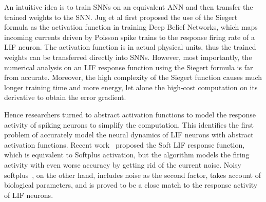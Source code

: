 \documentclass{article}
\begin{document}
An intuitive idea is to train SNNs on an equivalent ANN and then transfer the trained weights to the SNN.
Jug et al\cite{Jug_etal_2012} first proposed the use of the Siegert formula as the activation function in training Deep Belief Networks, which maps incoming currents driven by Poisson spike trains to the response firing rate of a LIF neuron.
The activation function is in actual physical units, thus the trained weights can be transferred directly into SNNs.
However, most importantly, the numerical analysis on an LIF response function using the Siegert formula is far from accurate.
Moreover, the high complexity of the Siegert function causes much longer training time and more energy, let alone the high-cost computation on its derivative to obtain the error gradient.

Hence researchers turned to abstract activation functions to model the response activity of spiking neurons to simplify the computation. %
This identifies the first problem of accurately model the neural dynamics of LIF neurons with abstract activation functions.
Recent work~\cite{hunsberger2015spiking} proposed the Soft LIF response function, which is equivalent to Softplus activation, but the algorithm models the firing activity with even worse accuracy by getting rid of the current noise.
Noisy softplus~\cite{Noisysoftplus}, on the other hand, includes noise as the second factor, takes account of biological parameters, and is proved to be a close match to the response activity of LIF neurons. 
\end{document}
